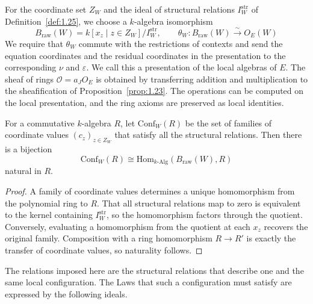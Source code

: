 \begin{definition}\label{def:2.1}

For the coordinate set $Z_W$ and the ideal of structural relations $I_W^{\mathrm{str}}$ of
Definition~\ref{def:1.25}, we choose a $k$-algebra isomorphism
\begin{equation*}
B_{\mathrm{raw}}(W)=k[x_z\mid z\in Z_W]/I_W^{\mathrm{str}},
\qquad
\theta_W:B_{\mathrm{raw}}(W)\xrightarrow{\sim}O_E(W)
\tag{2.1}\label{eq:2.1}
\end{equation*}
We require that $\theta_W$ commute with the restrictions of contexts and send the equation
coordinates and the residual coordinates in the presentation to the corresponding $\nu$ and
$\varepsilon$. We call this a presentation of the local algebras of $E$. The sheaf of rings
$\mathcal{O}=a_JO_E$ is obtained by transferring addition and multiplication to the
sheafification of Proposition~\ref{prop:1.23}. The operations can be computed on the local
presentation, and the ring axioms are preserved as local identities.

\end{definition}

\begin{proposition}\label{prop:2.2}

For a commutative $k$-algebra $R$, let $\mathrm{Conf}_W(R)$ be the set of families of
coordinate values $(c_z)_{z\in Z_W}$ that satisfy all the structural relations. Then there
is a bijection
\[
\mathrm{Conf}_W(R)
\cong\mathrm{Hom}_{k\text{-}\mathrm{Alg}}(B_{\mathrm{raw}}(W),R)
\]
natural in $R$.

\end{proposition}

\begin{proof}

A family of coordinate values determines a unique homomorphism from the polynomial ring to
$R$. That all structural relations map to zero is equivalent to the kernel containing
$I_W^{\mathrm{str}}$, so the homomorphism factors through the quotient. Conversely,
evaluating a homomorphism from the quotient at each $x_z$ recovers the original family.
Composition with a ring homomorphism $R\to R'$ is exactly the transfer of coordinate
values, so naturality follows.

\end{proof}

The relations imposed here are the structural relations that describe one and the same
local configuration. The Laws that such a configuration must satisfy are expressed by the
following ideals.

